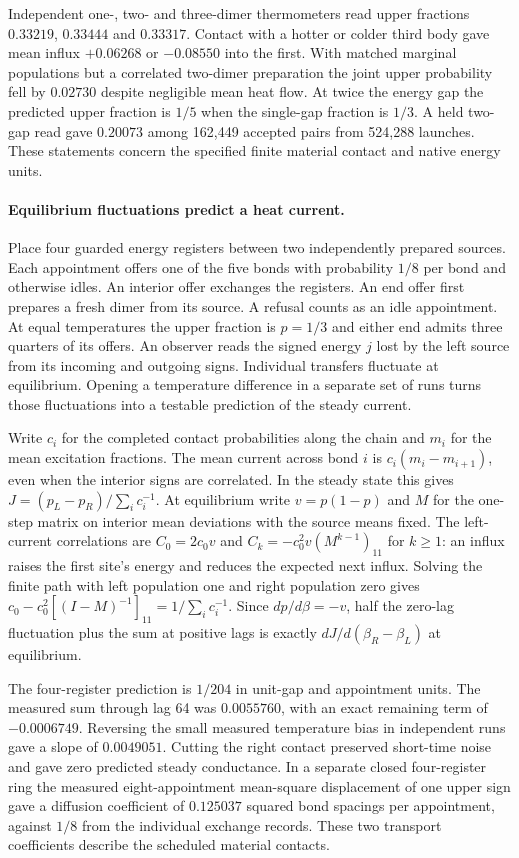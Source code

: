 \documentclass[11pt]{article}
\theoremstyle{remark}
\theoremstyle{plain}
\begin{document}
Independent one-, two- and three-dimer thermometers read upper fractions
$0.33219$, $0.33444$ and $0.33317$. Contact with a hotter or colder
third body gave mean influx $+0.06268$ or $-0.08550$ into the first.
With matched marginal populations but a correlated two-dimer preparation
the joint upper probability fell by $0.02730$ despite negligible mean
heat flow. At twice the energy gap the predicted upper fraction is
$1/5$ when the single-gap fraction is $1/3$. A held two-gap read
gave $0.20073$ among 162,449 accepted pairs from 524,288 launches.
These statements concern the specified finite material contact and
native energy units.

\paragraph{Equilibrium fluctuations predict a heat current.}
Place four guarded energy registers between two independently prepared
sources. Each appointment offers one of the five bonds with probability
$1/8$ per bond and otherwise idles. An interior offer exchanges the
registers. An end offer first prepares a fresh dimer from its source.
A refusal counts as an idle appointment. At equal temperatures the upper
fraction is $p=1/3$ and either end admits three quarters of its offers.
An observer reads the signed energy $j$ lost by the left source from its
incoming and outgoing signs. Individual transfers fluctuate at equilibrium.
Opening a temperature difference in a separate set of runs turns those
fluctuations into a testable prediction of the steady current.

Write $c_i$ for the completed contact probabilities along the chain and
$m_i$ for the mean excitation fractions. The mean current across bond $i$
is $c_i(m_i-m_{i+1})$, even when the interior signs are correlated. In
the steady state this gives $J=(p_L-p_R)/\sum_i c_i^{-1}$. At equilibrium
write $v=p(1-p)$ and $M$ for the one-step matrix on interior mean
deviations with the source means fixed. The left-current correlations are
$C_0=2c_0v$ and $C_k=-c_0^2v(M^{k-1})_{11}$ for $k\ge1$: an influx
raises the first site's energy and reduces the expected next influx.
Solving the finite path with left population one and right population
zero gives $c_0-c_0^2[(I-M)^{-1}]_{11}=1/\sum_i c_i^{-1}$.
Since $dp/d\beta=-v$, half the zero-lag fluctuation plus the sum at
positive lags is exactly $dJ/d(\beta_R-\beta_L)$ at equilibrium.

The four-register prediction is $1/204$ in unit-gap and appointment
units. The measured sum through lag 64 was $0.0055760$, with an exact
remaining term of $-0.0006749$. Reversing the small measured temperature
bias in independent runs gave a slope of $0.0049051$. Cutting the
right contact preserved short-time noise and gave zero predicted steady
conductance. In a separate closed four-register ring the measured
eight-appointment mean-square displacement of one upper sign gave a
diffusion coefficient of $0.125037$ squared bond spacings per appointment,
against $1/8$ from the individual exchange records. These two transport
coefficients describe the scheduled material contacts.
\end{document}
